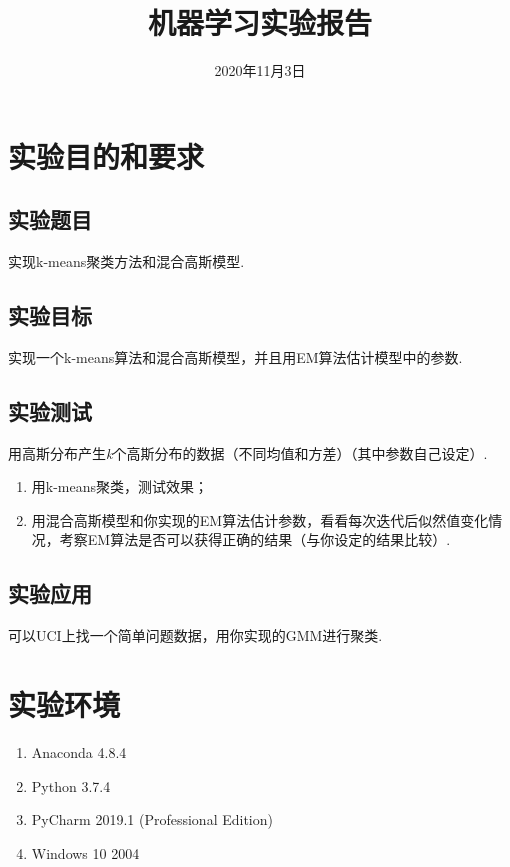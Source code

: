 \documentclass{hitreport}
\title{机器学习实验报告}
\date{2020年11月3日}
\begin{document}
\maketitle

\tableofcontents
\newpage




\section{实验目的和要求}

\subsection{实验题目}
实现k-means聚类方法和混合高斯模型.

\subsection{实验目标}
实现一个k-means算法和混合高斯模型，并且用EM算法估计模型中的参数.

\subsection{实验测试}

用高斯分布产生\textit{k}个高斯分布的数据（不同均值和方差）（其中参数自己设定）.
\begin{enumerate}
\item 用k-means聚类，测试效果；
\item 用混合高斯模型和你实现的EM算法估计参数，看看每次迭代后似然值变化情况，考察EM算法是否可以获得正确的结果（与你设定的结果比较）.
\end{enumerate}

\subsection{实验应用}
可以UCI上找一个简单问题数据，用你实现的GMM进行聚类.

\section{实验环境}

\begin{enumerate}
\item Anaconda 4.8.4
\item Python 3.7.4
\item PyCharm 2019.1 (Professional Edition)
\item Windows 10 2004
\end{enumerate}
\end{document}
